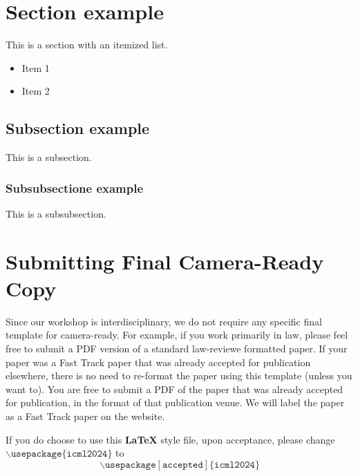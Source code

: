 \documentclass{article}
\theoremstyle{plain}
\theoremstyle{definition}
\theoremstyle{remark}
\begin{document}
\printAffiliationsAndNotice{\icmlEqualContribution} %

\begin{abstract}
This document provides a basic paper template and submission guidelines.
If using this (optional) template, your short abstract should go here.
\end{abstract}


\section{Section example}
\label{sec}

This is a section with an itemized list. 

\begin{itemize}
    \item Item 1
    \item Item 2
\end{itemize}

\subsection{Subsection example}

This is a subsection. 

\subsubsection{Subsubsectione example}
This is a subsubsection. 

\section{Submitting Final Camera-Ready Copy}

Since our workshop is interdisciplinary, we do not require any specific final template for camera-ready. 
For example, if you work primarily in law, please feel free to submit a PDF version of a standard law-reviewe formatted paper. If your paper was a Fast Track paper that was already accepted for publication elsewhere, there is no need to re-format the paper using this template (unless you want to). You are free to submit a PDF of the paper that was already accepted for publication, in the format of that publication venue. We will label the paper as a Fast Track paper on the website. 

If you do choose to use this \textbf{\LaTeX} style file, upon acceptance, please change 
$\mathtt{\backslash usepackage\{icml2024\}}$ to
$$\mathtt{\backslash usepackage[accepted]\{icml2024\}}$$
\end{document}
